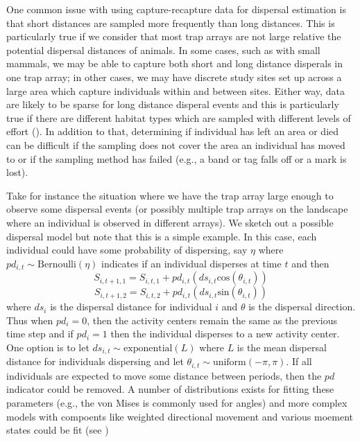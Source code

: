One common issue with using capture-recapture data for dispersal
estimation is that short distances are sampled more frequently than
long distances.  This is particularly true if we consider that most
trap arrays are not large relative the potential dispersal distances
of animals.  In some cases, such as with small mammals, we may be able
to capture both short and long distance disperals in one trap array;
in other cases, we may have discrete study sites set up across a large
area which capture individuals within and between sites.  Either way,
data are likely to be sparse for long distance disperal events and
this is particularly true if there are different habitat types which
are sampled with different levels of effort
(\cite{ovaskainen_etal:2008}).  In addition to that, determining if
individual has left an area or died can be difficult if the sampling
does not cover the area an individual has moved to or if the sampling
method has failed (e.g., a band or tag falls off or a mark is lost).

Take for instance the situation where we have the trap array large
enough to observe some dispersal events (or possibly multiple trap
arrays on the landscape where an individual is observed in different
arrays).  We sketch out a possible dispersal model but note that this
is a simple example.  In this case, each individual could have some
probability of dispersing, say $\eta$ where $pd_{i,t} \sim
\mbox{Bernoulli}(\eta)$ indicates if an individual disperses at time
$t$ and then
\[
S_{i,t+1,1}= S_{i,t,1} + pd_{i,t} (ds_{i, t} \mbox{cos}(\theta_{i,t}))
\]
\[
S_{i,t+1,2}= S_{i,t,2} + pd_{i,t} (ds_{i,t} \mbox{sin}(\theta_{i,t}))
\]
where $ds_i$ is the dispersal distance for individual $i$ and $\theta$
is the dispersal direction.  Thus when $pd_i =0$, then the activity
centers remain the same as the previous time step and if $pd_i = 1$
then the individual disperses to a new activity center.  One option is
to let $ds_{i,t} \sim \mbox{exponential}(L)$ where $L$ is the mean
dispersal distance for individuals dispersing and let $\theta_{i,t}
\sim \mbox{uniform}(-\pi, \pi)$.  If all individuals are expected to
move some distance between periods, then the $pd$ indicator could be
removed.  A number of distributions exists for fitting these
parameters (e.g., the von Mises is commonly used for angles) and more
complex models with compoents like weighted directional movement and
various moement states could be
fit (see \cite{jonsen_etal:2005, johnson_etal:2008, mcclintock_etal:2012})



